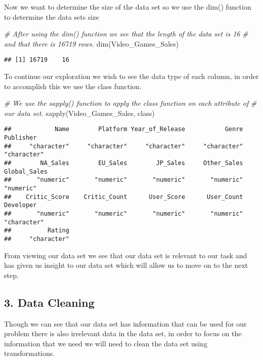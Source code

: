 \documentclass[
]{article}
\newenvironment{Shaded}{\begin{snugshade}}{\end{snugshade}}
\newcommand{\CommentTok}[1]{\textcolor[rgb]{0.56,0.35,0.01}{\textit{#1}}}
\newcommand{\FunctionTok}[1]{\textcolor[rgb]{0.00,0.00,0.00}{#1}}
\newcommand{\NormalTok}[1]{#1}
\begin{document}
Now we want to determine the size of the data set so we use the dim()
function to determine the data sets size

\begin{Shaded}
\begin{Highlighting}[]
\CommentTok{\# After using the dim() function we see that the length of the data set is 16}
\CommentTok{\# and that there is 16719 rows.}
\FunctionTok{dim}\NormalTok{(Video\_Games\_Sales)}
\end{Highlighting}
\end{Shaded}

\begin{verbatim}
## [1] 16719    16
\end{verbatim}

To continue our exploration we wish to see the data type of each column,
in order to accomplish this we use the class function.

\begin{Shaded}
\begin{Highlighting}[]
\CommentTok{\# We use the sapply() function to apply the class function on each attribute of}
\CommentTok{\# our data set.}
\FunctionTok{sapply}\NormalTok{(Video\_Games\_Sales, class)}
\end{Highlighting}
\end{Shaded}

\begin{verbatim}
##            Name        Platform Year_of_Release           Genre       Publisher 
##     "character"     "character"     "character"     "character"     "character" 
##        NA_Sales        EU_Sales        JP_Sales     Other_Sales    Global_Sales 
##       "numeric"       "numeric"       "numeric"       "numeric"       "numeric" 
##    Critic_Score    Critic_Count      User_Score      User_Count       Developer 
##       "numeric"       "numeric"       "numeric"       "numeric"     "character" 
##          Rating 
##     "character"
\end{verbatim}

From viewing our data set we see that our data set is relevant to our
task and has given us insight to our data set which will allow us to
move on to the next step.

\hypertarget{data-cleaning}{%
\subsection{3. Data Cleaning}\label{data-cleaning}}

Though we can see that our data set has information that can be used for
our problem there is also irrelevant data in the data set, in order to
focus on the information that we need we will need to clean the data set
using transformations.
\end{document}
